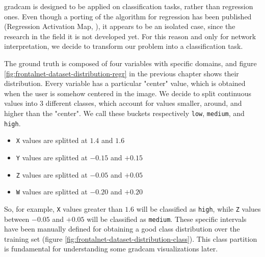 \gls{gradcam} is designed to be applied on classification tasks, rather than regression ones. Even though a porting of the algorithm for regression has been published (Regression Activation Map, \cite{wang2019diabetic}), it appears to be an isolated case, since the research in the field it is not developed yet. For this reason and only for network interpretation, we decide to transform our problem into a classification task.

The ground truth is composed of four variables with specific domains, and figure \ref{fig:frontalnet-dataset-distribution-regr} in the previous chapter shows their distribution. Every variable has a particular "center" value, which is obtained when the user is somehow centered in the image. We decide to split continuous values into 3 different classes, which account for values smaller, around, and higher than the "center". We call these buckets respectively \texttt{low}, \texttt{medium}, and \texttt{high}.

\begin{itemize}
	\item \texttt{X} values are splitted at $1.4$ and $1.6$
	\item \texttt{Y} values are splitted at $-0.15$ and $+0.15$
	\item \texttt{Z} values are splitted at $-0.05$ and $+0.05$
	\item \texttt{W} values are splitted at $-0.20$ and $+0.20$
\end{itemize}

So, for example, \texttt{X} values greater than $1.6$ will be classified as \texttt{high}, while \texttt{Z} values between $-0.05$ and $+0.05$ will be classified as \texttt{medium}. These specific intervals have been manually defined for obtaining a good class distribution over the training set (figure \ref{fig:frontalnet-dataset-distribution-class}). This class partition is fundamental for understanding some \gls{gradcam} visualizations later.

